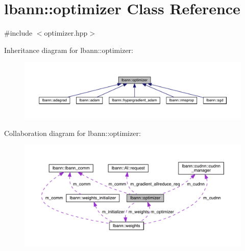 \hypertarget{classlbann_1_1optimizer}{}\section{lbann\+:\+:optimizer Class Reference}
\label{classlbann_1_1optimizer}


{\ttfamily \#include $<$optimizer.\+hpp$>$}



Inheritance diagram for lbann\+:\+:optimizer\+:\nopagebreak
\begin{figure}[H]
\begin{center}
\leavevmode
\includegraphics[width=350pt]{classlbann_1_1optimizer__inherit__graph}
\end{center}
\end{figure}


Collaboration diagram for lbann\+:\+:optimizer\+:\nopagebreak
\begin{figure}[H]
\begin{center}
\leavevmode
\includegraphics[width=350pt]{classlbann_1_1optimizer__coll__graph}
\end{center}
\end{figure}
